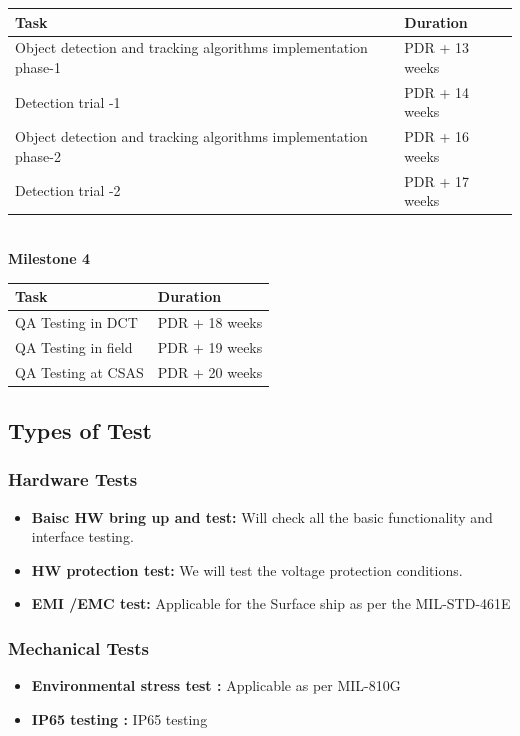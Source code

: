 \documentclass[a4paper,12pt]{article}
\begin{document}
	\noindent
	\begin{tabular}{|l|l|}
		\hline
		\textbf{Task} & \textbf{Duration} \\
		\hline
		Object detection and tracking algorithms implementation phase-1 & PDR + 13 weeks \\
		\hline
		Detection trial -1 & PDR + 14 weeks \\
		\hline
		Object detection and tracking algorithms implementation phase-2 & PDR + 16 weeks \\
		\hline
		Detection trial -2 & PDR + 17 weeks \\
		\hline
	\end{tabular}
	\\
	\newline
	\noindent
	\textbf{Milestone 4}\\
	
\noindent
\begin{tabular}{|l|l|}
	\hline
	\textbf{Task} & \textbf{Duration} \\
	\hline
	QA Testing in DCT & PDR + 18 weeks \\
	\hline
	QA Testing in field & PDR + 19 weeks \\
	\hline
	QA Testing at CSAS & PDR + 20 weeks \\
	\hline
\end{tabular}

	\newpage
	\subsection{Types of Test}
	
	\subsubsection{Hardware Tests}
	
	\begin{itemize}
		\item \textbf{Baisc HW bring up and test: }
		Will check all the basic functionality and interface testing.
		\item \textbf{HW protection test:}
		We will test the voltage protection conditions. 
		\item \textbf{EMI /EMC test: }
		Applicable for the Surface ship as per the MIL-STD-461E 
		
	\end{itemize}
	
	\subsubsection{Mechanical Tests}
	\begin{itemize}
	\item \textbf{Environmental stress test : }
	Applicable as per MIL-810G 
	\item \textbf{IP65 testing : }
	IP65 testing
	\end{itemize}
\end{document}
